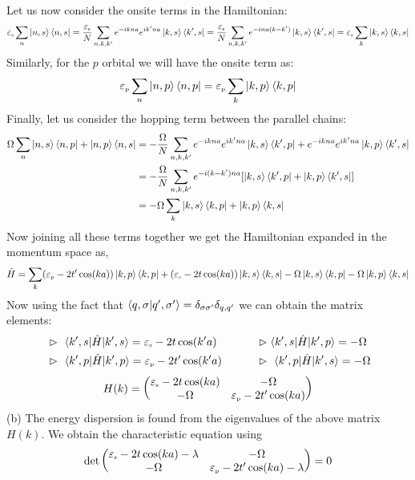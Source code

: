 \documentclass[usenames, svgnames, dvipsnames]{scrartcl}
\newcommand{\tund}[1]{_{\text{\tiny #1}}}
\begin{document}
Let us now consider the onsite terms in the Hamiltonian:
\begin{align*}
    \varepsilon\tund{s}\sum\limits_n \ket{n,s}\bra{n,s} = \frac{ \varepsilon\tund{s}}{N}\sum\limits_{n,k,k'} e^{-ikna}e^{ik'na}\ket{k,s}\bra{k',s} = \frac{ \varepsilon\tund{s}}{N}\sum\limits_{n,k,k'} e^{-ina(k-k')}\ket{k,s}\bra{k',s} = \varepsilon\tund{s}\sum\limits_k \ket{k,s}\bra{k,s} 
\end{align*}
Similarly, for the $p$ orbital we will have the onsite term as: 
$$\varepsilon\tund{p}\sum\limits_n \ket{n,p}\bra{n,p} = \varepsilon\tund{p}\sum\limits_k \ket{k,p}\bra{k,p} $$
Finally, let us consider the hopping term between the parallel chains: 
\begin{align*}
    \Omega \sum\limits_n \ket{n,s}\bra{n,p} + \ket{n,p}\bra{n,s} &= -\frac{\Omega}{N} \sum\limits_{n,k,k'} e^{-ikna} e^{ik'na} \ket{k,s}\bra{k',p} + e^{-ikna} e^{ik'na} \ket{k,p}\bra{k',s} \\
    &= -\frac{\Omega}{N} \sum\limits_{n,k,k'} e^{-i(k-k')na} \qty[ \ket{k,s}\bra{k',p} +\ket{k,p}\bra{k',s}]\\
    &=-\Omega \sum\limits_k \ket{k,s}\bra{k,p} + \ket{k,p}\bra{k,s}
\end{align*}
Now joining all these terms together we get the Hamiltonian expanded in the momentum space as, 
\begin{align*}
    \hat{H} = \sum\limits_k (\varepsilon\tund{p}-2t'\cos(ka)) \ket{k,p}\bra{k,p} +(\varepsilon\tund{s}-2t\cos(ka)) \ket{k,s}\bra{k,s} -\Omega \ket{k,s}\bra{k,p} -\Omega \ket{k,p}\bra{k,s}
\end{align*}
Now using the fact that $\braket{q,\sigma|q',\sigma'} = \delta_{\sigma \sigma'}\delta_{q,q'}$ we can obtain the matrix elements: 
\begin{alignat*}{3}
     &\vartriangleright\ \braket{k',s|\hat{H}|k',s}  = \varepsilon\tund{s}-2t\cos(k'a)\qquad &&\vartriangleright\braket{k',s|\hat{H}|k',p}  = -\Omega\\
   &\vartriangleright\ \braket{k',p|\hat{H}|k',p}  = \varepsilon\tund{p}-2t'\cos(k'a) \qquad &&\vartriangleright\ \braket{k',p|\hat{H}|k',s}  =-\Omega
\end{alignat*}
$$H(k) = \mqty(\varepsilon\tund{s}-2t\cos(ka) & -\Omega \\ -\Omega & \varepsilon\tund{p}-2t'\cos(ka))$$
(b) The energy dispersion is found from the eigenvalues of the above matrix $H(k)$. We obtain the characteristic equation using 
$$\det \mqty(\varepsilon\tund{s}-2t\cos(ka)-\lambda & -\Omega \\ -\Omega & \varepsilon\tund{p}-2t'\cos(ka)-\lambda) = 0  $$
\end{document}
